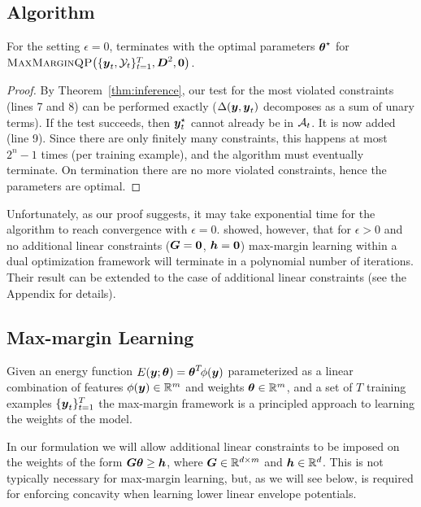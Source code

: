 \documentclass[twoside,doublespace,onecolumn,11pt,a4paper]{book}
\renewcommand{\citename}{\citet}
\newcommand{\mmqp}[3]{\textrm{\sc MaxMarginQP}\!\left(\{\by_t, #1\}_{t=1}^{T}, #2, #3\right)}
\begin{document}
\subsection{Algorithm}
\label{sec:MISC}

\begin{theorem}
  For the setting $\epsilon = 0$,  terminates
  with the optimal parameters $\boldsymbol{\theta}^\star$ for
  $\mmqp{\Y_t}{\bD^2}{\zeros}$.
  \label{thm:learning}
\end{theorem}
%
\begin{proof}
  By Theorem~\ref{thm:inference}, our test for the most violated
  constraints (lines 7 and 8) can be performed exactly ($\Delta({\boldsymbol{y}},
  {\boldsymbol{y}}_t)$ decomposes as a sum of unary terms). If the test succeeds,
  then ${\boldsymbol{y}}_t^\star$ cannot already be in ${\cal A}_t$. It is now added
  (line 9). Since there are only finitely many constraints, this
  happens at most $2^n - 1$ times (per training example), and the
  algorithm must eventually terminate. On termination there are no
  more violated constraints, hence the parameters are optimal.
\end{proof}
\bigskip

Unfortunately, as our proof suggests, it may take exponential time for
the algorithm to reach convergence with $\epsilon =
0$. \citename{Tsochantaridis:JMLR05} showed, however, that for
$\epsilon > 0$ and no additional linear constraints (\ie ${\boldsymbol{G}} =
\textbf{0}$, ${\boldsymbol{h}} = \textbf{0}$) max-margin learning within a dual
optimization framework will terminate in a polynomial number of
iterations. Their result can be extended to the case of additional
linear constraints (see the Appendix for details).

\subsection{Max-margin Learning}
%
Given an energy function $E\!\left({\boldsymbol{y}}; \boldsymbol{\theta}\right) = \boldsymbol{\theta}^T \!
\phi({\boldsymbol{y}})$ parameterized as a linear combination of features
$\phi({\boldsymbol{y}}) \in \mathbb{R}^m$ and weights $\boldsymbol{\theta} \in \mathbb{R}^m$, and
a set of $T$ training examples $\{{\boldsymbol{y}}_t\}_{t=1}^T$ the max-margin
framework is a principled approach to learning the weights of the
model.

In our formulation we will allow additional linear constraints to
be imposed on the weights of the form ${\boldsymbol{G}} \boldsymbol{\theta} \geq {\boldsymbol{h}}$,
where ${\boldsymbol{G}} \in \mathbb{R}^{d \times m}$ and ${\boldsymbol{h}} \in \mathbb{R}^d$. This
is not typically necessary for max-margin learning, but, as we
will see below, is required for enforcing concavity when learning
lower linear envelope potentials.
\end{document}
